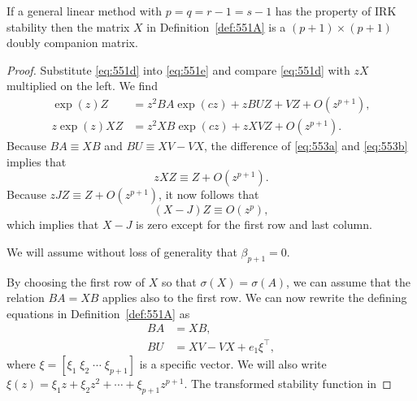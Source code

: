 \begin{theorem}

  \label{thm:553A}
If a general linear method with $p = q = r - 1 = s - 1$ has the property of IRK stability then the matrix $X$ in Definition~\ref{def:551A} is a $(p + 1) \times (p + 1)$ doubly companion matrix.
\end{theorem}

\begin{proof}
Substitute \eqref{eq:551d} into \eqref{eq:551e} and compare \eqref{eq:551d} with $zX$ multiplied on the left. We find
\begin{align}
    \exp(z)Z &= z^{2}BA\exp(cz) + zBU Z + V Z + O(z^{p+1}), \label{eq:553a} \\
    z\exp(z)XZ &= z^{2}XB\exp(cz) + zXV Z + O(z^{p+1}). \label{eq:553b}
\end{align}
Because $BA \equiv XB$ and $BU \equiv XV - VX$, the difference of \eqref{eq:553a} and \eqref{eq:553b} implies that
\[
zXZ \equiv Z + O(z^{p+1}).
\]
Because $zJZ \equiv Z + O(z^{p+1})$, it now follows that
\[
(X - J)Z \equiv O(z^{p}),
\]
which implies that $X - J$ is zero except for the first row and last column.

We will assume without loss of generality that $\beta_{p+1} = 0$.

By choosing the first row of $X$ so that $\sigma(X) = \sigma(A)$, we can assume that the relation $BA = XB$ applies also to the first row. We can now rewrite the defining equations in Definition~\ref{def:551A} as
\begin{align}
    BA &= XB, \label{eq:553c} \\
    BU &= XV - VX + e_{1}\xi^{\top}, \label{eq:553d}
\end{align}
where $\xi = [\xi_{1} \; \xi_{2} \; \cdots \; \xi_{p+1}]$ is a specific vector. We will also write $\xi(z) = \xi_{1}z + \xi_{2}z^{2} + \cdots + \xi_{p+1}z^{p+1}$. The transformed stability function in
\end{proof}
